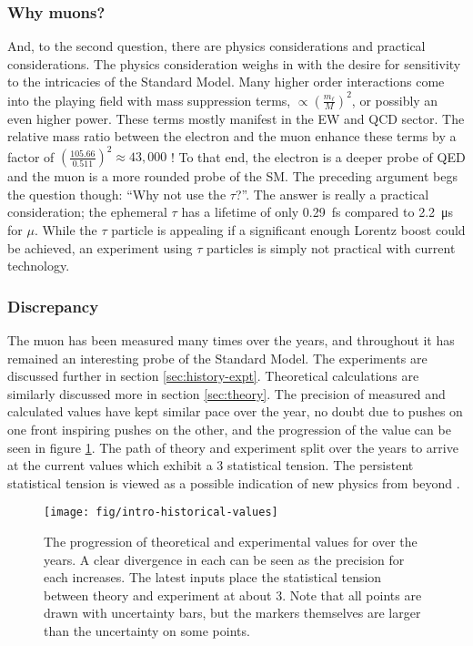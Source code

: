 \subsubsection{Why muons?}
And, to the second question, there are physics considerations and practical considerations.  The physics consideration weighs in with the desire for sensitivity to the intricacies of the Standard Model.  Many higher order interactions come into the playing field with mass suppression terms, $\propto (\frac{m_\ell}{M})^2$, or possibly an even higher power.  These terms mostly manifest in the EW and QCD sector.  The relative mass ratio between the electron and the muon enhance these terms by a factor of $(\frac{105.66}{0.511})^2 \approx 43,000$ \cite{the-muon-g-2}!  To that end, the electron \gmtwo is a deeper probe of QED and the muon \gmtwo is a more rounded probe of the SM.  The preceding argument begs the question though: ``Why not use the $\tau$?''.  The answer is really a practical consideration; the ephemeral $\tau$ has a lifetime of only \SI{0.29}{\femto\second} compared to \SI{2.2}{\micro\second} for $\mu$\cite{codata}.  While the $\tau$ particle is appealing if a significant enough Lorentz boost could be achieved, an experiment using $\tau$ particles is simply not practical with current technology.

\subsubsection{Discrepancy}

The muon \gmtwo has been measured many times over the years, and throughout it has remained an interesting probe of the Standard Model.  The experiments are discussed further in section \ref{sec:history-expt}.  Theoretical calculations are similarly discussed more in section \ref{sec:theory}.  The precision of measured and calculated \mugmtwo values have kept similar pace over the year, no doubt due to pushes on one front inspiring pushes on the other, and the progression of the value can be seen in figure \ref{fig:intro-historical-values}.  The path of theory and experiment split over the years to arrive at the current values which exhibit a \SI{3}{\sigma} statistical tension.  The persistent statistical tension is viewed as a possible indication of new physics from beyond \tsm.

\begin{figure}
\label{fig:intro-historical-values}
\centering
\texttt{[image: fig/intro-historical-values]}
\caption{The progression of theoretical and experimental values for \mugmtwo over the years.  A clear divergence in each can be seen as the precision for each increases.  The latest inputs place the statistical tension between theory and experiment at about \SI{3}{\sigma}. Note that all points are drawn with uncertainty bars, but the markers themselves are larger than the uncertainty on some points. }
\end{figure}

